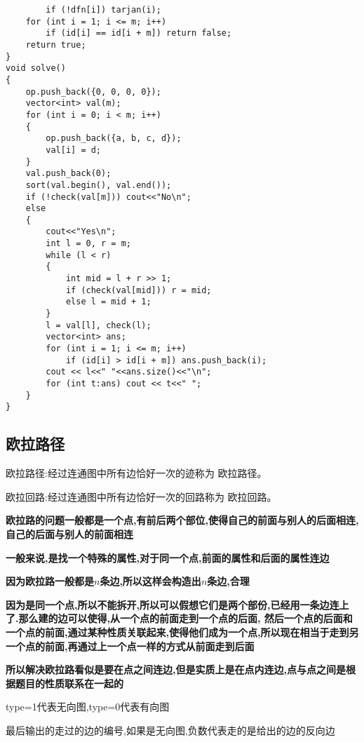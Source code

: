 \documentclass[a4paper,fontset=none]{ctexart}
\begin{document}
\begin{verbatim}
        if (!dfn[i]) tarjan(i);
    for (int i = 1; i <= m; i++)
        if (id[i] == id[i + m]) return false;
    return true;
}
void solve()
{
    op.push_back({0, 0, 0, 0});
    vector<int> val(m);
    for (int i = 0; i < m; i++)
    {
        op.push_back({a, b, c, d});
        val[i] = d;
    }
    val.push_back(0);
    sort(val.begin(), val.end());
    if (!check(val[m])) cout<<"No\n";
    else
    {
        cout<<"Yes\n";
        int l = 0, r = m;
        while (l < r)
        {
            int mid = l + r >> 1;
            if (check(val[mid])) r = mid;
            else l = mid + 1;
        }
        l = val[l], check(l);
        vector<int> ans;
        for (int i = 1; i <= m; i++)
            if (id[i] > id[i + m]) ans.push_back(i);
        cout << l<<" "<<ans.size()<<"\n";
        for (int t:ans) cout << t<<" ";
    }
}
\end{verbatim}

\subsection{欧拉路径}

欧拉路径:经过连通图中所有边恰好一次的迹称为 欧拉路径。

欧拉回路:经过连通图中所有边恰好一次的回路称为 欧拉回路。

\textbf{欧拉路的问题一般都是一个点,有前后两个部位,使得自己的前面与别人的后面相连,自己的后面与别人的前面相连}

\textbf{一般来说,是找一个特殊的属性,对于同一个点,前面的属性和后面的属性连边}

\textbf{因为欧拉路一般都是$n$条边,所以这样会构造出$n$条边,合理}

\textbf{因为是同一个点,所以不能拆开,所以可以假想它们是两个部份,已经用一条边连上了.那么建的边可以使得,从一个点的前面走到一个点的后面,
然后一个点的后面和一个点的前面,通过某种性质关联起来,使得他们成为一个点,所以现在相当于走到另一个点的前面,再通过上一个点一样的方式从前面走到后面}

\textbf{所以解决欧拉路看似是要在点之间连边,但是实质上是在点内连边,点与点之间是根据题目的性质联系在一起的}

type=1代表无向图,type=0代表有向图

最后输出的走过的边的编号,如果是无向图,负数代表走的是给出的边的反向边
\end{document}
